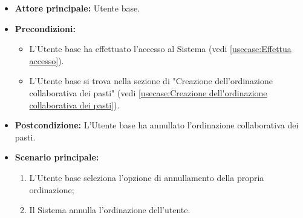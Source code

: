 \label{usecase:Annullamento dell'ordinazione}
\begin{itemize}
	\item \textbf{Attore principale:} Utente base.

	\item \textbf{Precondizioni:}
	\begin{itemize}
		\item L'Utente base ha effettuato l'accesso al Sistema (vedi \autoref{usecase:Effettua accesso}).
		\item L'Utente base si trova nella sezione di "Creazione dell'ordinazione collaborativa dei pasti" (vedi \autoref{usecase:Creazione dell'ordinazione collaborativa dei pasti}).
	\end{itemize}

	\item \textbf{Postcondizione:}
	      L'Utente base ha annullato l'ordinazione collaborativa dei pasti.

	\item \textbf{Scenario principale:}
	      \begin{enumerate}
		      \item L'Utente base seleziona l'opzione di annullamento
		            della propria ordinazione;

		      \item Il Sistema annulla l'ordinazione dell'utente.
	      \end{enumerate}
\end{itemize}
